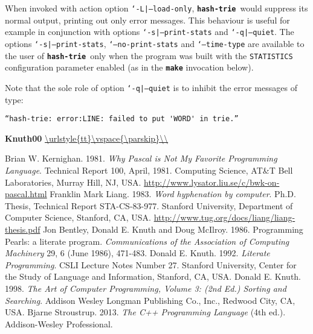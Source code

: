 \documentclass[a4paper,11pt]{article}
\renewcommand{\=}{\protect\nobreakdash-\hspace{0pt}}
\renewcommand{\~}{\protect\nobreakdash--\hspace{0pt}}
\newcommand{\hashtrie}{{\tt\textbf{hash-trie}}}
\newcommand\hashtrie*{\emph{hash\=trie}}
\newcommand{\opt}[1]{\nohyphens{\tt{`#1\textquotesingle}}}
\newcommand{\code}[1]{{\tt{#1}}}
\newcommand\code*[1]{\mbox{\code{#1}}}
\newcommand{\prog}[1]{{\tt\textbf{#1}}}
\newcommand{\msg}[1]{%
	\vspace{-\parskip}%
	\begin{center}%
	{\tt``}\lstinline[basicstyle=\ttfamily]{#1}{\tt''}
	\end{center}%
	\vspace{-\parskip}}
\newcommand{\msgdot}[1]{%
	\msg{#1.}}
\newenvironment{bbibliography}[1]{%
	\begin{thebibliography}{\textbf{#1}}%
	\DeclareUrlCommand\url{\urlstyle{tt}\vspace{\parskip}\\}
}{%
	\end{thebibliography}%
}
\begin{document}
%
When invoked with action option \opt{-L|--load-only}, \hashtrie\ would suppress
its normal output, printing out only error messages. This behaviour is useful
for example in conjunction with options \opt{-s|--print-stats} and \opt{-q|--quiet}.
The options \opt{-s|--print-stats}, \opt{--no-print-stats} and \opt{--time-type}
are available to the user of \hashtrie\ only when the program was built with the
\code{STATISTICS} configuration parameter enabled (as in the \prog{make}
invocation below).
%
%
Note that the sole role of option \opt{-q|--quiet} is to inhibit the error messages
of type: \msgdot{hash-trie: error:LINE: failed to put 'WORD' in trie}
%
\begin{bbibliography}{Knuth00}
%
	Brian W. Kernighan. 1981.
	\emph{Why Pascal is Not My Favorite Programming Language}. 
	Technical Report 100, April, 1981.
	Computing Science, AT\&T Bell Laboratories,
	Murray Hill, NJ, USA.
	\url{http://www.lysator.liu.se/c/bwk-on-pascal.html}
	Franklin Mark Liang. 1983.
	\emph{Word hyphenation by computer}.
	Ph.D. Thesis, Technical Report STA\=CS\=83\=977.
	Stanford University, Department of Computer Science,
	Stanford, CA, USA.
	\url{http://www.tug.org/docs/liang/liang-thesis.pdf}
	Jon Bentley, Donald E. Knuth and Doug McIlroy. 1986.
	Programming Pearls: a literate program.
	\emph{Communications of the Association of Computing Machinery}
	29, 6 (June 1986), 471-483.
	Donald E. Knuth. 1992.
	\emph{Literate Programming}.
	CSLI Lecture Notes Number 27.
	Stanford University, Center for the Study of Language and Information,
	Stanford, CA, USA.
	Donald E. Knuth. 1998.
	\emph{The Art of Computer Programming,  Volume 3: (2nd Ed.) Sorting and Searching}.
	Addison Wesley Longman Publishing Co., Inc.,
	Redwood City, CA, USA.
	Bjarne Stroustrup. 2013.
	\emph{The C++ Programming Language} (4th ed.).
	Addison-Wesley Professional.
%
\end{bbibliography}
\end{document}
